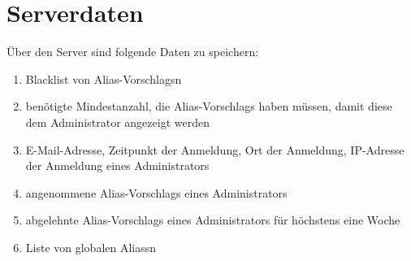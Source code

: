 \section{Serverdaten}

Über den Server sind folgende Daten zu speichern:
\begin{enumerate}[label=\textbf{/D\arabic*0/}, align=left]
	\setcounter{enumi}{\value{user_data_end}}
	\item Blacklist von \Glspl{Alias-Vorschlag}n
	\item benötigte Mindestanzahl, die \Glspl{Alias-Vorschlag} haben müssen, damit diese dem \Gls{Administrator} angezeigt werden
	\item E-Mail-Adresse, Zeitpunkt der Anmeldung, Ort der Anmeldung, IP-Adresse der Anmeldung eines \Gls{Administrator}s
	\item angenommene \Glspl{Alias-Vorschlag} eines \Gls{Administrator}s
	\item abgelehnte \Glspl{Alias-Vorschlag} eines \Gls{Administrator}s für höchstens eine Woche
	\item Liste von globalen \Glspl{Alias}n
\end{enumerate}
